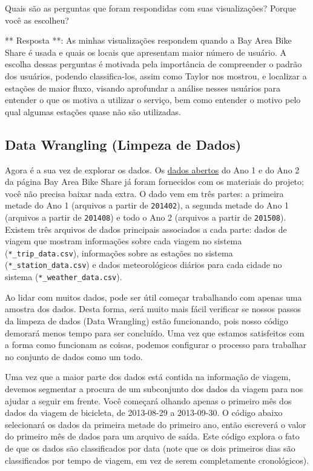 \documentclass[11pt]{article}
\begin{document}
Quais são as perguntas que foram respondidas com suas visualizações?
Porque você as escolheu?

    ** Resposta **: As minhas visualizações respondem quando a Bay Area Bike
Share é usada e quais os locais que apresentam maior número de usuário.
A escolha dessas perguntas é motivada pela importância de compreender o
padrão dos usuários, podendo classifica-los, assim como Taylor nos
mostrou, e localizar a estações de maior fluxo, visando aprofundar a
análise nesses usuários para entender o que os motiva a utilizar o
serviço, bem como entender o motivo pelo qual algumas estações quase não
são utilizadas.

    \subsection{Data Wrangling (Limpeza de
Dados)}\label{data-wrangling-limpeza-de-dados}

Agora é a sua vez de explorar os dados. Os
\href{http://www.bayareabikeshare.com/open-data}{dados abertos} do Ano 1
e do Ano 2 da página Bay Area Bike Share já foram fornecidos com os
materiais do projeto; você não precisa baixar nada extra. O dado vem em
três partes: a primeira metade do Ano 1 (arquivos a partir de
\texttt{201402}), a segunda metade do Ano 1 (arquivos a partir de
\texttt{201408}) e todo o Ano 2 (arquivos a partir de \texttt{201508}).
Existem três arquivos de dados principais associados a cada parte: dados
de viagem que mostram informações sobre cada viagem no sistema
(\texttt{*\_trip\_data.csv}), informações sobre as estações no sistema
(\texttt{*\_station\_data.csv}) e dados meteorológicos diários para cada
cidade no sistema (\texttt{*\_weather\_data.csv}).

Ao lidar com muitos dados, pode ser útil começar trabalhando com apenas
uma amostra dos dados. Desta forma, será muito mais fácil verificar se
nossos passos da limpeza de dados (Data Wrangling) estão funcionando,
pois nosso código demorará menos tempo para ser concluído. Uma vez que
estamos satisfeitos com a forma como funcionam as coisas, podemos
configurar o processo para trabalhar no conjunto de dados como um todo.

Uma vez que a maior parte dos dados está contida na informação de
viagem, devemos segmentar a procura de um subconjunto dos dados da
viagem para nos ajudar a seguir em frente. Você começará olhando apenas
o primeiro mês dos dados da viagem de bicicleta, de 2013-08-29 a
2013-09-30. O código abaixo selecionará os dados da primeira metade do
primeiro ano, então escreverá o valor do primeiro mês de dados para um
arquivo de saída. Este código explora o fato de que os dados são
classificados por data (note que os dois primeiros dias são
classificados por tempo de viagem, em vez de serem completamente
cronológicos).
\end{document}
